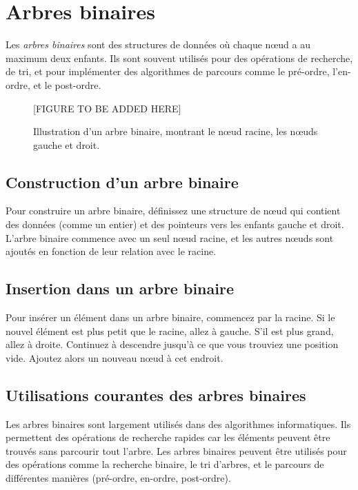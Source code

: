 \section{Arbres binaires}

Les \emph{arbres binaires} sont des structures de données où chaque nœud a au maximum deux enfants. Ils sont souvent utilisés pour des opérations de recherche, de tri, et pour implémenter des algorithmes de parcours comme le pré-ordre, l'en-ordre, et le post-ordre.

\begin{figure}[H]
	\centering
	[FIGURE TO BE ADDED HERE]
	\caption{Illustration d'un arbre binaire, montrant le nœud racine, les nœuds gauche et droit.}
\end{figure}

\subsection{Construction d'un arbre binaire}
Pour construire un arbre binaire, définissez une structure de nœud qui contient des données (comme un entier) et des pointeurs vers les enfants gauche et droit. L'arbre binaire commence avec un seul nœud racine, et les autres nœuds sont ajoutés en fonction de leur relation avec le racine.

\subsection{Insertion dans un arbre binaire}
Pour insérer un élément dans un arbre binaire, commencez par la racine. Si le nouvel élément est plus petit que le racine, allez à gauche. S'il est plus grand, allez à droite. Continuez à descendre jusqu'à ce que vous trouviez une position vide. Ajoutez alors un nouveau nœud à cet endroit.

\subsection{Utilisations courantes des arbres binaires}
Les arbres binaires sont largement utilisés dans des algorithmes informatiques. Ils permettent des opérations de recherche rapides car les éléments peuvent être trouvés sans parcourir tout l'arbre. Les arbres binaires peuvent être utilisés pour des opérations comme la recherche binaire, le tri d'arbres, et le parcours de différentes manières (pré-ordre, en-ordre, post-ordre).


